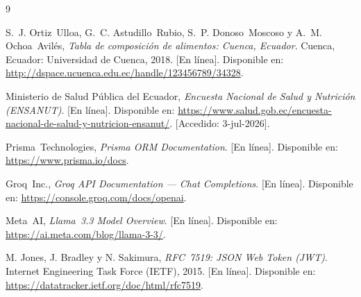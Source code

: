 \documentclass[12pt,a4paper]{article}
\begin{document}
\begin{thebibliography}{9}

S.~J. Ortiz~Ulloa, G.~C. Astudillo~Rubio, S.~P. Donoso~Moscoso y A.~M. Ochoa~Avilés,
\textit{Tabla de composición de alimentos: Cuenca, Ecuador}.
Cuenca, Ecuador: Universidad de Cuenca, 2018.
[En línea]. Disponible en:
\url{http://dspace.ucuenca.edu.ec/handle/123456789/34328}.

Ministerio de Salud Pública del Ecuador,
\textit{Encuesta Nacional de Salud y Nutrición (ENSANUT)}.
[En línea]. Disponible en:
\url{https://www.salud.gob.ec/encuesta-nacional-de-salud-y-nutricion-ensanut/}.
[Accedido: 3-jul-2026].

Prisma~Technologies,
\textit{Prisma ORM Documentation}.
[En línea]. Disponible en: \url{https://www.prisma.io/docs}.

Groq~Inc.,
\textit{Groq API Documentation — Chat Completions}.
[En línea]. Disponible en: \url{https://console.groq.com/docs/openai}.

Meta~AI,
\textit{Llama~3.3 Model Overview}.
[En línea]. Disponible en: \url{https://ai.meta.com/blog/llama-3-3/}.

M. Jones, J. Bradley y N. Sakimura,
\textit{RFC~7519: JSON Web Token (JWT)}.
Internet Engineering Task Force (IETF), 2015.
[En línea]. Disponible en: \url{https://datatracker.ietf.org/doc/html/rfc7519}.

\end{thebibliography}
\end{document}
